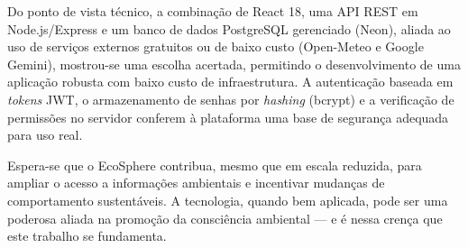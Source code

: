 \documentclass[
	12pt,
	openright,
	oneside,
	a4paper,
	chapter=TITLE,
	section=TITLE,
	subsection=TITLE,
	subsubsection=TITLE,
	english,
	brazil
	]{abntex2}
\begin{document}
Do ponto de vista técnico, a combinação de React 18, uma API REST em Node.js/Express e um banco de dados PostgreSQL gerenciado (Neon), aliada ao uso de serviços externos gratuitos ou de baixo custo (Open-Meteo e Google Gemini), mostrou-se uma escolha acertada, permitindo o desenvolvimento de uma aplicação robusta com baixo custo de infraestrutura. A autenticação baseada em \textit{tokens} JWT, o armazenamento de senhas por \textit{hashing} (bcrypt) e a verificação de permissões no servidor conferem à plataforma uma base de segurança adequada para uso real.

Espera-se que o EcoSphere contribua, mesmo que em escala reduzida, para ampliar o acesso a informações ambientais e incentivar mudanças de comportamento sustentáveis. A tecnologia, quando bem aplicada, pode ser uma poderosa aliada na promoção da consciência ambiental — e é nessa crença que este trabalho se fundamenta.

\postextual


\end{document}
